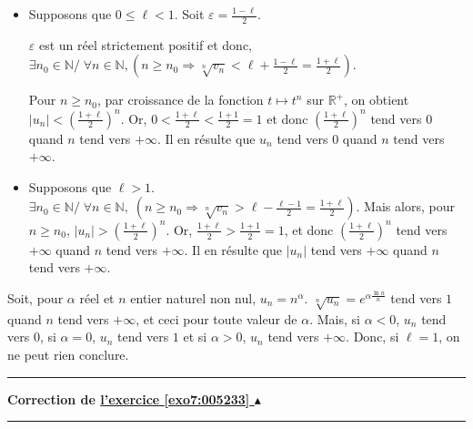 \documentclass[11pt,a4paper]{article}
\newcommand{\Nn}{\mathbb{N}} \newcommand{\N}{\mathbb{N}}
\newcommand{\Rr}{\mathbb{R}} \newcommand{\R}{\mathbb{R}}
\newcounter{exo}
\newcommand{\correction}[1]{\hypertarget{cor7:#1}{}\label{cor7:#1}{\bf Correction de \hyperlink{exo7:#1}{l'exercice \ref{exo7:#1} $\blacktriangle$}}\vspace{1mm}\hrule\vspace{1mm}}
\newcommand{\fincorrection}{\vspace{1mm}\hrule\vspace*{7mm}}
\begin{document}
\begin{itemize}
\item[\textbullet] Supposons que $0\leq\ell<1$. Soit $\varepsilon=\frac{1-\ell}{2}$.

$\varepsilon$ est un réel strictement positif et donc, $\exists n_0\in\Nn/\;\forall n\in\Nn,(n\geq n_0\Rightarrow\sqrt[n]{v_n}<\ell+\frac{1-\ell}{2}=\frac{1+\ell}{2})$.

Pour $n\geq n_0$, par croissance de la fonction $t\mapsto t^n$ sur $\Rr^+$, on obtient $|u_n|<\left(\frac{1+\ell}{2}\right)^n$. Or, $0<\frac{1+\ell}{2}<\frac{1+1}{2}=1$ et donc 
$\left(\frac{1+\ell}{2}\right)^n$ tend vers $0$ quand $n$ tend vers $+\infty$. Il en résulte que $u_n$ tend vers  $0$ quand $n$ tend vers $+\infty$.

\item[\textbullet] Supposons que $\ell>1$. $\exists n_0\in\Nn/\;\forall n\in\Nn,\;(n\geq n_0\Rightarrow\sqrt[n]{v_n}>\ell-\frac{\ell-1}{2}=\frac{1+\ell}{2})$. Mais alors, pour $n\geq n_0$, $|u_n|>\left(\frac{1+\ell}{2}\right)^n$. Or, $\frac{1+\ell}{2}>\frac{1+1}{2}=1$, et donc $\left(\frac{1+\ell}{2}\right)^n$ tend vers $+\infty$ quand $n$ tend vers $+\infty$. Il en résulte que $|u_n|$ tend vers $+\infty$ quand $n$ tend vers $+\infty$.
\end{itemize}
Soit, pour $\alpha$ réel et $n$ entier naturel non nul, $u_n=n^\alpha$. $\sqrt[n]{u_n}=e^{\alpha\frac{\ln n}{n}}$ tend vers $1$ quand $n$ tend vers $+\infty$, et ceci pour toute valeur de $\alpha$. Mais, si $\alpha<0$, $u_n$ tend vers $0$, si $\alpha=0$, $u_n$ tend vers $1$ et si $\alpha>0$, $u_n$ tend vers $+\infty$. Donc, si $\ell=1$, on ne peut rien conclure.
\fincorrection
\correction{005233}
\end{document}
